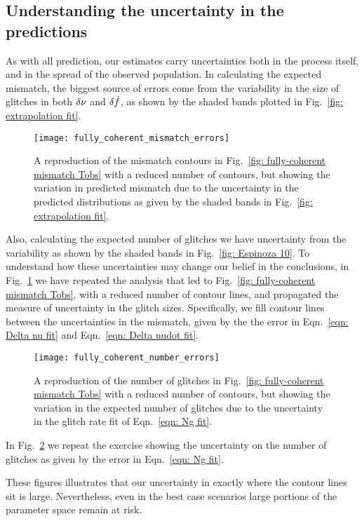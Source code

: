 \documentclass[../full_thesis/full_thesis.tex]{subfiles}
\begin{document}
\begin{subappendices}
\section{Understanding the uncertainty in the predictions}
\label{sec: uncertainties}

As with all prediction, our estimates carry uncertainties both in the process
itself, and in the spread of the observed population. In calculating the
expected mismatch, the biggest source of errors come from the variability in
the size of glitches in both $\delta\nu$ and $\delta\dot{f}$, as shown by the
shaded bands plotted in Fig.~\ref{fig: extrapolation fit}.
\begin{figure}[htb]
\centering
\texttt{[image: fully\_coherent\_mismatch\_errors]}
\caption{A reproduction of the mismatch contours in Fig.~\ref{fig:
fully-coherent mismatch Tobs} with a
reduced number of contours, but showing the variation in predicted mismatch
due to the uncertainty in the predicted distributions as given by the shaded bands in
Fig.~\ref{fig: extrapolation fit}.}
\label{fig: fully-coherent mismatch Tobs errors}
\end{figure}
Also, calculating the expected number of glitches we have
uncertainty from the variability as shown by the shaded bands in Fig.~\ref{fig:
Espinoza 10}. To understand how these uncertainties may change our belief in
the conclusions, in Fig.~\ref{fig: fully-coherent mismatch Tobs errors} we have
repeated the analysis that led to Fig.~\ref{fig: fully-coherent mismatch Tobs},
with a reduced number of
contour lines, and propagated the measure of uncertainty in the glitch sizes.
Specifically, we fill contour lines between the uncertainties in the mismatch, given by
the the error in Eqn.~\eqref{eqn: Delta nu fit} and
Eqn.~\eqref{eqn: Delta nudot fit}.
\begin{figure}[htb]
\centering
\texttt{[image: fully\_coherent\_number\_errors]}
\caption{A reproduction of the number of glitches in Fig.~\ref{fig:
fully-coherent mismatch Tobs} with a
reduced number of contours, but showing the variation in the expected number
of glitches due to the uncertainty in the glitch rate fit of Eqn.~\eqref{eqn:
Ng fit}.}
\label{fig: fully-coherent number Tobs errors}
\end{figure}
In Fig.~\ref{fig: fully-coherent number Tobs errors}
we repeat the exercise showing the uncertainty on the number of glitches as
given by the error in Eqn.~\eqref{eqn: Ng fit}.

These figures illustrates that our uncertainty in exactly where the contour lines
sit is large. Nevertheless, even in the best case scenarios large portions of the
parameter space remain at risk.
\end{subappendices}

\biblio
\end{document}
